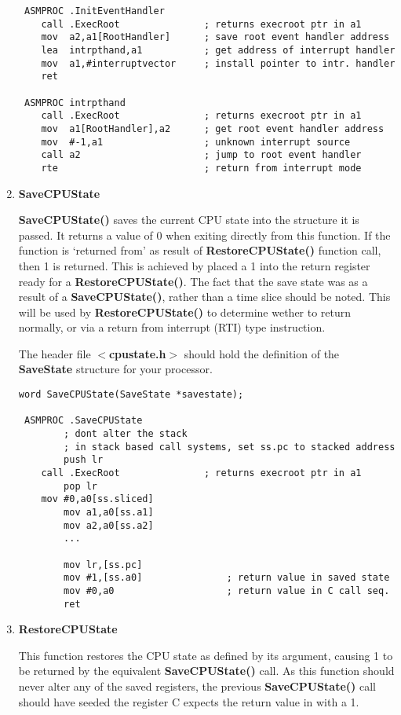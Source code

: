 \begin{enumerate}
\begin{verbatim}
 ASMPROC .InitEventHandler
    call .ExecRoot               ; returns execroot ptr in a1
    mov  a2,a1[RootHandler]      ; save root event handler address
    lea  intrpthand,a1           ; get address of interrupt handler
    mov  a1,#interruptvector     ; install pointer to intr. handler
    ret

 ASMPROC intrpthand
    call .ExecRoot               ; returns execroot ptr in a1
    mov  a1[RootHandler],a2      ; get root event handler address
    mov  #-1,a1                  ; unknown interrupt source
    call a2                      ; jump to root event handler
    rte                          ; return from interrupt mode
\end{verbatim}
\normalsize

\item {\bf SaveCPUState}

{\bf SaveCPUState()} saves the current CPU state into the structure it is
passed. It returns a value of 0 when exiting directly from this function.
If the function is `returned from' as result of {\bf RestoreCPUState()}
function call, then 1 is returned. This is achieved by placed a
1 into the return register ready for a {\bf RestoreCPUState()}. The fact that
the save state was as a result of a {\bf SaveCPUState()}, rather than a time
slice should be noted. This will be used by {\bf RestoreCPUState()} to
determine wether to return normally, or via a return from interrupt (RTI)
type instruction.

The header file {\bf $<$cpustate.h$>$}
should hold the definition of the {\bf SaveState} structure for your processor.

\scriptsize
\begin{verbatim}
word SaveCPUState(SaveState *savestate);

 ASMPROC .SaveCPUState
        ; dont alter the stack
        ; in stack based call systems, set ss.pc to stacked address
        push lr
    call .ExecRoot               ; returns execroot ptr in a1
        pop lr
	mov #0,a0[ss.sliced]
        mov a1,a0[ss.a1] 
        mov a2,a0[ss.a2] 
        ...

        mov lr,[ss.pc] 
        mov #1,[ss.a0]               ; return value in saved state
        mov #0,a0                    ; return value in C call seq.
        ret
\end{verbatim}
\normalsize
\vfill
\newpage

\item {\bf RestoreCPUState}

This function restores the CPU state as defined by its argument, causing
1 to be returned by the equivalent {\bf SaveCPUState()} call. As this function
should never alter any of the saved registers, the previous {\bf SaveCPUState()}
call should have seeded the register C expects the return value in with a
1.


\end{enumerate}

